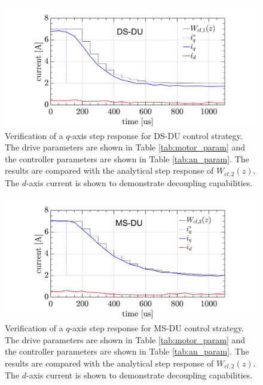 \documentclass[conference]{IEEEtran}
\begin{document}
\begin{figure}[t!]
    \centerline{\includegraphics[width=1\linewidth]{figures/ivan figs/DSDUstepHIL.png}}
    \caption{Verification of a $q$-axis step response for DS-DU control strategy. The drive parameters are shown in Table \ref{tab:motor_param} and the controller parameters are shown in Table \ref{tab:an_param}. The results are compared with the analytical step response of $W_{cl,2}(z)$. The $d$-axis current is shown to demonstrate decoupling capabilities.}
    \label{fig:DSDU_step} 
\end{figure}
\begin{figure}[t!]
    \centerline{\includegraphics[width=1\linewidth]{figures/ivan figs/MSDUstepHIL.png}}
    \caption{Verification of a $q$-axis step response for MS-DU control strategy. The drive parameters are shown in Table \ref{tab:motor_param} and the controller parameters are shown in Table \ref{tab:an_param}. The results are compared with the analytical step response of $W_{cl,2}(z)$. The $d$-axis current is shown to demonstrate decoupling capabilities.}
    \label{fig:MSDU_step} 
\end{figure}
\end{document}
